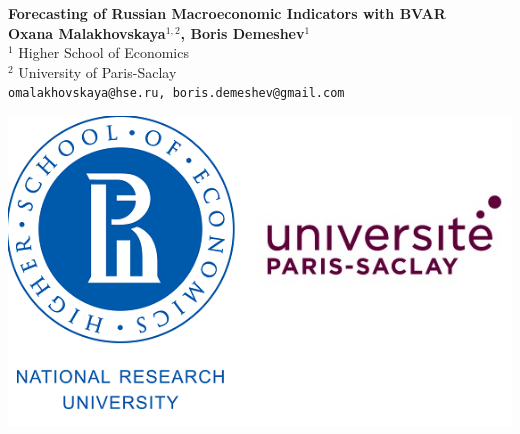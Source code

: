 \documentclass[a0, landscape]{a0poster}
\begin{document}


\begin{minipage}[b]{0.75\linewidth}
\veryHuge \color{NavyBlue} \textbf{Forecasting of Russian Macroeconomic Indicators with BVAR} \color{Black}\\ %

\huge \textbf{Oxana Malakhovskaya$^{1,2}$, Boris Demeshev$^{1}$}\\[0.5cm] %
\Large $^{1}$ Higher School of Economics\\[0.4cm] %
\Large $^{2}$ University of Paris-Saclay\\[0.4cm] %
\Large \texttt{omalakhovskaya@hse.ru, boris.demeshev@gmail.com} \\
\end{minipage}
%
\begin{minipage}[b]{0.25\linewidth}
\includegraphics[width=20cm]{both_logos.png}
\end{minipage}

\vspace{1cm} %
\end{document}
